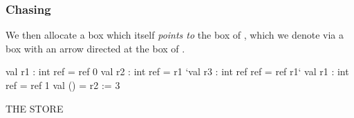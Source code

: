 \documentclass[aspectratio=169, handout]{beamer}
\newcommand{\topthing}[2]{
      \begin{minipage}[t][#1][t]{\textwidth}
        \vspace{\fill}
        #2
        \vspace{\fill}
      \end{minipage}
    }
\begin{document}
\begin{frame}[fragile]
  \frametitle{ Chasing}

  \topthing{0.2in}{
    We then allocate a box which itself \textit{points to} the box of \code{r1},
    which we denote via a box with an arrow directed at the box of \code{r1}.
  }

  \vspace{10pt}

  \begin{center}
    \begin{minipage}[t][2.1in][t]{0.6\textwidth}
      \vspace{\fill}
      \begin{codeblock}
        val r1 : int ref     = ref 0
        val r2 : int ref     = r1
        `val r3 : int ref ref = ref r1`
        val r1 : int ref     = ref 1
        val ()               = r2 := 3
      \end{codeblock}
      \vspace{\fill}
    \end{minipage}
    \hfill\vline\hfill
    \begin{minipage}[t][2.1in][t]{0.3\textwidth}
      \centering
      {\hspace{-20pt}\color{gray} \large THE STORE}

      \vspace{\fill}
      \vspace{\fill}
    \end{minipage}
  \end{center}
\end{frame}
\end{document}
